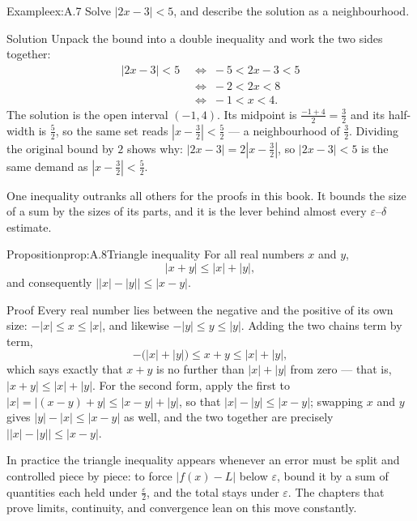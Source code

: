 \documentclass[a4paper,12pt,oneside]{memoir}
\begin{document}
\begin{workedexample}
\begin{envexample}{Example}{ex:A.7}{}
Solve \(|2x - 3| < 5\), and describe the solution as a neighbourhood.
\end{envexample}
\begin{envsolution}{Solution}{}{}
Unpack the bound into a double inequality and work the two sides together: \[ \begin{aligned}
          |2x - 3| < 5
            &\;\Longleftrightarrow\; -5 < 2x - 3 < 5 \\
            &\;\Longleftrightarrow\; -2 < 2x < 8 \\
            &\;\Longleftrightarrow\; -1 < x < 4.
        \end{aligned} \] The solution is the open interval \((-1, 4)\). Its midpoint is \(\tfrac{-1 + 4}{2} = \tfrac{3}{2}\) and its half-width is \(\tfrac{5}{2}\), so the same set reads \(\left|x - \tfrac{3}{2}\right| < \tfrac{5}{2}\) — a neighbourhood of \(\tfrac{3}{2}\). Dividing the original bound by \(2\) shows why: \(|2x - 3| = 2\left|x - \tfrac{3}{2}\right|\), so \(|2x - 3| < 5\) is the same demand as \(\left|x - \tfrac{3}{2}\right| < \tfrac{5}{2}\).
\end{envsolution}
\end{workedexample}
One inequality outranks all others for the proofs in this book. It bounds the size of a sum by the sizes of its parts, and it is the lever behind almost every \(\varepsilon\)–\(\delta\) estimate.

\begin{envproposition}{Proposition}{prop:A.8}{Triangle inequality}
For all real numbers \(x\) and \(y\), \[ |x + y| \le |x| + |y|, \] and consequently \(\bigl||x| - |y|\bigr| \le |x - y|\).
\end{envproposition}
\begin{envproof}{Proof}{}{}
Every real number lies between the negative and the positive of its own size: \(-|x| \le x \le |x|\), and likewise \(-|y| \le y \le |y|\). Adding the two chains term by term, \[ -\bigl(|x| + |y|\bigr) \le x + y \le |x| + |y|, \] which says exactly that \(x + y\) is no further than \(|x| + |y|\) from zero — that is, \(|x + y| \le |x| + |y|\). For the second form, apply the first to \(|x| = |(x - y) + y| \le |x - y| + |y|\), so that \(|x| - |y| \le |x - y|\); swapping \(x\) and \(y\) gives \(|y| - |x| \le |x - y|\) as well, and the two together are precisely \(\bigl||x| - |y|\bigr| \le |x - y|\). \qedmark
\end{envproof}
In practice the triangle inequality appears whenever an error must be split and controlled piece by piece: to force \(|f(x) - L|\) below \(\varepsilon\), bound it by a sum of quantities each held under \(\tfrac{\varepsilon}{2}\), and the total stays under \(\varepsilon\). The chapters that prove limits, continuity, and convergence lean on this move constantly.
\end{document}
